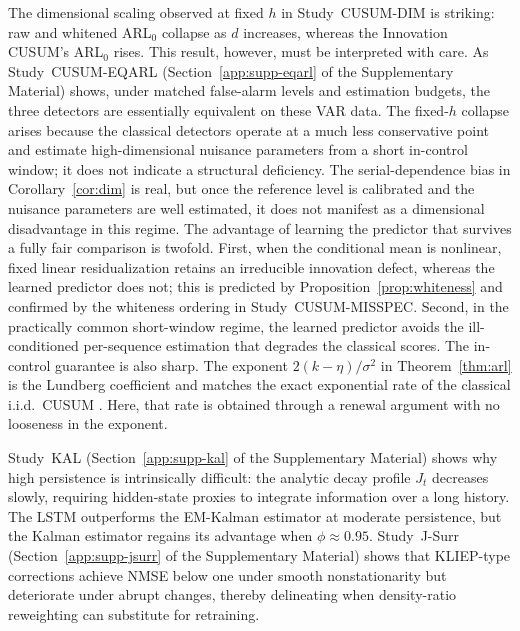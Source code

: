 \documentclass[bj,authoryear]{imsart}
\theoremstyle{plain}
\theoremstyle{definition}
\begin{document}
The dimensional scaling observed at fixed $h$ in Study~CUSUM-DIM is striking: raw and whitened ARL$_0$ collapse as $d$ increases, whereas the Innovation CUSUM's ARL$_0$ rises. This result, however, must be interpreted with care. As Study~CUSUM-EQARL (Section~\ref{app:supp-eqarl} of the Supplementary Material) shows, under matched false-alarm levels and estimation budgets, the three detectors are essentially equivalent on these VAR data. The fixed-$h$ collapse arises because the classical detectors operate at a much less conservative point and estimate high-dimensional nuisance parameters from a short in-control window; it does not indicate a structural deficiency. The serial-dependence bias in Corollary~\ref{cor:dim} is real, but once the reference level is calibrated and the nuisance parameters are well estimated, it does not manifest as a dimensional disadvantage in this regime.
%
The advantage of learning the predictor that survives a fully fair comparison is twofold. First, when the conditional mean is nonlinear, fixed linear residualization retains an irreducible innovation defect, whereas the learned predictor does not; this is predicted by Proposition~\ref{prop:whiteness} and confirmed by the whiteness ordering in Study~CUSUM-MISSPEC. Second, in the practically common short-window regime, the learned predictor avoids the ill-conditioned per-sequence estimation that degrades the classical scores.
%
The in-control guarantee is also sharp. The exponent $2(k-\eta)/\sigma^2$ in Theorem~\ref{thm:arl} is the Lundberg coefficient and matches the exact exponential rate of the classical i.i.d.\ CUSUM \citep[Ch.~3]{siegmund1985sequential}. Here, that rate is obtained through a renewal argument with no looseness in the exponent.


Study~KAL (Section~\ref{app:supp-kal} of the Supplementary Material) shows why high persistence is intrinsically difficult: the analytic decay profile $J_t$ decreases slowly, requiring hidden-state proxies to integrate information over a long history. The LSTM outperforms the EM-Kalman estimator at moderate persistence, but the Kalman estimator regains its advantage when $\phi\approx0.95$. Study~J-Surr (Section~\ref{app:supp-jsurr} of the Supplementary Material) shows that KLIEP-type corrections achieve NMSE below one under smooth nonstationarity but deteriorate under abrupt changes, thereby delineating when density-ratio reweighting can substitute for retraining.

\end{document}
